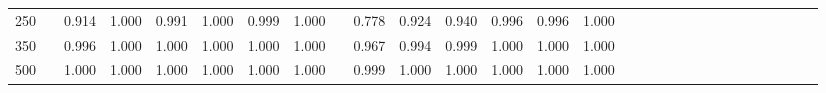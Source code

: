 % 
\begin{tabular}{ccccccccccccccccccccccccccccc}
  \hline
  \hline
250 &  & 0.914 & 1.000 & 0.991 & 1.000 & 0.999 & 1.000 &  & 0.778 & 0.924 & 0.940 & 0.996 & 0.996 & 1.000 &  &  &  &  &  &  &  &  &  &  &  &  &  &  \\ 
  350 &  & 0.996 & 1.000 & 1.000 & 1.000 & 1.000 & 1.000 &  & 0.967 & 0.994 & 0.999 & 1.000 & 1.000 & 1.000 &  &  &  &  &  &  &  &  &  &  &  &  &  &  \\ 
  500 &  & 1.000 & 1.000 & 1.000 & 1.000 & 1.000 & 1.000 &  & 0.999 & 1.000 & 1.000 & 1.000 & 1.000 & 1.000 &  &  &  &  &  &  &  &  &  &  &  &  &  &  \\ 
   \hline
\end{tabular}
